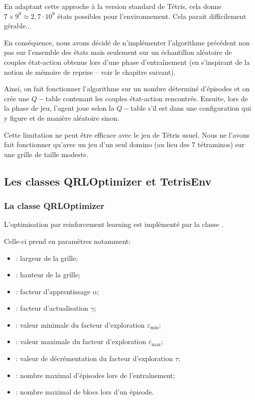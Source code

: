 En adaptant cette approche à la version standard de Tétris, cela donne $7 \times 9^{9}\approx 2{,}7\cdot 10^9$ états possibles pour l'environnement. Cela parait difficilement gérable...

\bigskip

En conséquence, nous avons décidé de n'implémenter l'algorithme précédent non pas sur l'ensemble des états mais seulement sur un échantillon aléatoire de couples état-action obtenus lors d'une phase d'entraînement (en s'inspirant de la notion de mémoire de reprise -- voir le chapitre suivant).

Ainsi, on fait fonctionner l'algorithme sur un nombre déterminé d'épisodes et on crée une $Q-$table contenant les couples état-action rencontrés. Ensuite, lors de la phase de jeu, l'agent joue selon la $Q-$table s'il est dans une configuration qui y figure et de manière aléatoire sinon.

\bigskip

Cette limitation ne peut être efficace avec le jeu de Tétris usuel. Nous ne l'avons fait fonctionner qu'avec un jeu d'un seul domino (au lieu des 7 tétraminos) sur une grille de taille modeste.

\subsection{Les classes QRLOptimizer et TetrisEnv}

\subsubsection{La classe QRLOptimizer}

L'optimisation par reinforcement learning est implémenté par la classe .

Celle-ci prend en paramètres notamment:
\begin{itemize}
	\item {}: largeur de la grille;
	\item {}: hauteur de la grille;
	\item {}: facteur d'apprentissage $\alpha$;
	\item {}: facteur d'actualisation $\gamma$;
	\item {}: valeur minimale du facteur d'exploration $\varepsilon_{\min}$;
	\item {}: valeur maximale du facteur d'exploration $\varepsilon_{\max}$;
	\item {}: valeur de décrémentation du facteur d'exploration $\tau$;
	\item {}: nombre maximal d'épisodes lors de l'entraînement;
	\item {}: nombre maximal de blocs lors d'un épisode.
\end{itemize}

